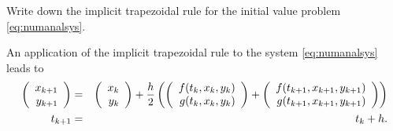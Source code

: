 \documentclass{ximera}
\begin{document}
\begin{exercise} \label{c15.1.2}
Write down the implicit trapezoidal rule for the initial
value problem \eqref{eq:numanalsys}.

\begin{solution}
An application of the implicit trapezoidal rule to
the system \eqref{eq:numanalsys} leads to
\begin{eqnarray*}
\left(\begin{array}{r} x_{k+1} \\ y_{k+1}\end{array}\right) & = &  \left(\begin{array}{r} x_k \\ y_k\end{array}\right) +
\frac{h}{2} \left(\left(\begin{array}{r} f(t_k,x_k,y_k) \\ g(t_k,x_k,y_k)\end{array}\right)
+\left(\begin{array}{r} f(t_{k+1},x_{k+1},y_{k+1}) \\ g(t_{k+1},x_{k+1},y_{k+1})\end{array}\right)\right)\\
t_{k+1} &=& t_k + h.
\end{eqnarray*}



\end{solution}
\end{exercise}
\end{document}
